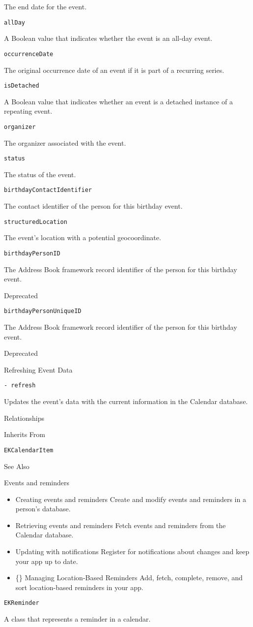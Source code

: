 \documentclass{article}
\begin{document}
The end date for the event.

\texttt{allDay}

A Boolean value that indicates whether the event is an all-day event.

\texttt{occurrenceDate}

The original occurrence date of an event if it is part of a recurring series.

\texttt{isDetached}

A Boolean value that indicates whether an event is a detached instance of a repeating event.

\texttt{organizer}

The organizer associated with the event.

\texttt{status}

The status of the event.

\texttt{birthdayContactIdentifier}

The contact identifier of the person for this birthday event.

\texttt{structuredLocation}

The event's location with a potential geocoordinate.

\texttt{birthdayPersonID}

The Address Book framework record identifier of the person for this birthday event.

Deprecated

\texttt{birthdayPersonUniqueID}

The Address Book framework record identifier of the person for this birthday event.

Deprecated

Refreshing Event Data

\texttt{- refresh}

Updates the event's data with the current information in the Calendar database.

Relationships

Inherits From

\texttt{EKCalendarItem}

See Also

Events and reminders

\begin{itemize}
    \item Creating events and reminders
    Create and modify events and reminders in a person's database.
    \item Retrieving events and reminders
    Fetch events and reminders from the Calendar database.
    \item Updating with notifications
    Register for notifications about changes and keep your app up to date.
    \item \{\} Managing Location-Based Reminders
    Add, fetch, complete, remove, and sort location-based reminders in your app.
\end{itemize}

\texttt{EKReminder}

A class that represents a reminder in a calendar.

\newpage
\end{document}
